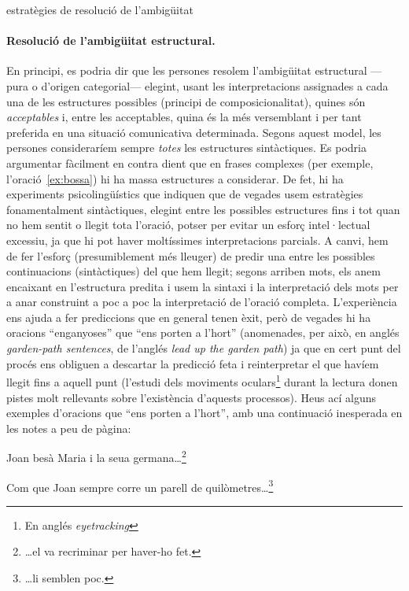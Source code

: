 \begin{persabermes}{estratègies de resolució de l'ambigüitat}
  \paragraph{Resolució de l'ambigüitat estructural.}
  \label{s3:resambest}
  En principi, es podria dir que les persones resolem l'ambigüitat
  estructural ---pura o d'origen categorial--- elegint, usant les
  interpretacions assignades a cada una de les estructures possibles
  (principi de composicionalitat), quines són \emph{acceptables} i,
  entre les acceptables, quina és la més versemblant i per tant
  preferida en una situació comunicativa determinada. Segons aquest
  model, les persones consideraríem sempre \emph{totes} les
  estructures sintàctiques. Es podria argumentar fàcilment en contra
  dient que en frases complexes (per exemple, l'oració~\ref{ex:bossa})
  hi ha massa estructures a considerar. De fet, hi ha experiments
  psicolingüístics que indiquen que de vegades usem estratègies
  fonamentalment sintàctiques, elegint entre les possibles estructures
  fins i tot quan no hem sentit o llegit tota l'oració, potser per
  evitar un esforç intel·lectual excessiu, ja que hi pot haver
  moltíssimes interpretacions parcials. A canvi, hem de fer l'esforç
  (presumiblement més lleuger) de predir una entre les possibles
  continuacions (sintàctiques) del que hem llegit; segons arriben
  mots, els anem encaixant en l'estructura predita i usem la sintaxi i
  la interpretació dels mots per a anar construint a poc a poc la
  interpretació de l'oració completa.  L'experiència ens ajuda a fer
  prediccions que en general tenen èxit, però de vegades hi ha
  oracions ``enganyoses'' que ``ens porten a l'hort'' (anomenades, per
  això, en anglés \emph{garden-path sentences}, de l'anglés \emph{lead
    up the garden path}) ja que en cert punt del procés ens obliguen a
  descartar la predicció feta i reinterpretar el que havíem llegit
  fins a aquell punt (l'estudi dels moviments oculars\footnote{En
    anglés \emph{eyetracking}} durant la lectura donen pistes molt
  rellevants sobre l'existència d'aquests processos).  Heus ací alguns
  exemples d'oracions que ``ens porten a l'hort'', amb una continuació
  inesperada en les notes a peu de pàgina:
  \begin{exemple}
    Joan besà Maria i la seua germana\ldots\footnote{\ldots el va
      recriminar per haver-ho fet.}
  \end{exemple}
  \begin{exemple}
    Com que Joan sempre corre un parell de
    quilòmetres\ldots\footnote{\ldots li semblen poc.}

\end{exemple}
\end{persabermes}
